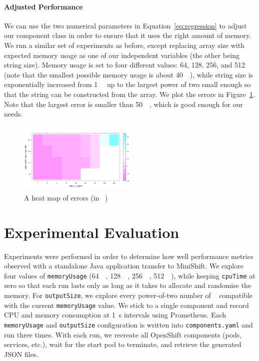 \documentclass{article}
\begin{document}
\paragraph{Adjusted Performance}

We can use the two numerical parameters in Equation~\eqref{eq:regression} to
adjust our component class in order to ensure that it uses the right amount
of memory. We run a similar set of experiments as before, except replacing array
size with expected memory usage as one of our independent variables (the other
being string size). Memory usage is set to four different values: 64, 128,
256, and \SI{512}{\mebi\byte} (note that the smallest possible memory usage is
about \SI{40}{\mebi\byte}), while string size is exponentially increased from
\SI{1}{\mebi\byte} up to the largest power of two small enough so that the
string can be constructed from the array. We plot the errors in
Figure~\ref{fig:adjustment}. Note that the largest error is smaller than
\SI{50}{\kibi\byte}, which is good enough for our needs.

\begin{figure}
  \centering
  \includegraphics[width=0.5\textwidth]{../local_experiments/memory_tests/adjusted.png}
  \caption{A heat map of errors (in \si{\kibi\byte})}
  \label{fig:adjustment}
\end{figure}

\section{Experimental Evaluation} \label{sec:experiments}

Experiments were performed in order to determine how well performance metrics
observed with a standalone Java application transfer to MiniShift. We explore
four values of \texttt{memoryUsage} (\SI{64}{\mebi\byte}, \SI{128}{\mebi\byte},
\SI{256}{\mebi\byte}, \SI{512}{\mebi\byte}), while keeping \texttt{cpuTime} at
zero so that each run lasts only as long as it takes to allocate and randomise
the memory. For \texttt{outputSize}, we explore every power-of-two number of
\si{\mebi\byte} compatible with the current \texttt{memoryUsage} value. We stick
to a single component and record CPU and memory consumption at \SI{1}{\second}
intervals using Prometheus. Each \texttt{memoryUsage} and \texttt{outputSize}
configuration is written into \texttt{components.yaml} and run three times. With
each run, we recreate all OpenShift components (pods, services, etc.), wait for
the start pod to terminate, and retrieve the generated JSON files.
\end{document}
